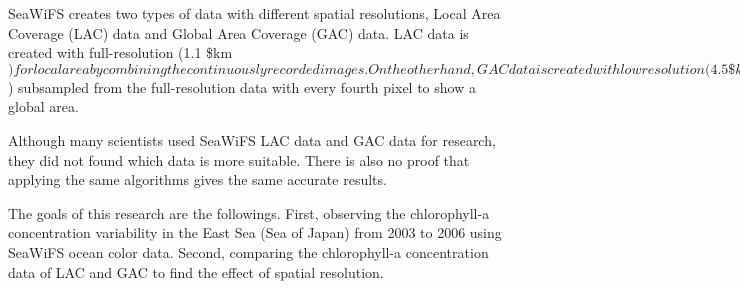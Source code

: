 SeaWiFS creates two types of data with different spatial resolutions, Local Area Coverage (LAC) data and Global Area Coverage (GAC) data. LAC data is created with full-resolution (1.1 \$km$) for local area by combining the continuously recorded images. On the other hand, GAC data is created with low resolution (4.5\$km$) subsampled from the full-resolution data with every fourth pixel to show a global area. 

Although many scientists used SeaWiFS LAC data and GAC data for research, they did not found which data is more suitable. There is also no proof that applying the same algorithms gives the same accurate results. 

The goals of this research are the followings. First, observing the chlorophyll-a concentration variability in the East Sea (Sea of Japan) from 2003 to 2006 using SeaWiFS ocean color data. Second, comparing the chlorophyll-a concentration data of LAC and GAC to find the effect of spatial resolution.

